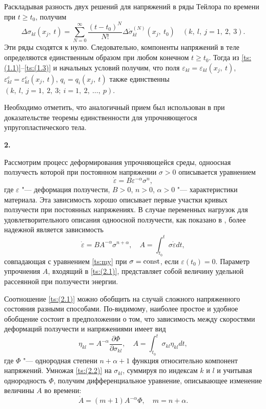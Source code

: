 Раскладывая разность двух решений для напряжений в ряды Тейлора по времени при $t\geq t_{0}$, получим
$$
\Delta\sigma_{kl}(x_{j},\:t)=\sum\limits_{N=0}^{\infty}\frac{(t-t_{0})^{N}}{N!}\Delta\dot{\sigma}_{kl}^{(N)}(x_{j},\:t_{0})\quad  (k,\:l,\:j=1,\:2,\:3).
$$
Эти ряды сходятся к нулю. 
Следовательно, компоненты напряжений в  теле определяются единственным образом при любом конечном $t\geq t_{0}$. 
Тогда из \eqref{ts:(1.1)}--\eqref{ts:(1.3)} и начальных условий получим, что поля 
$\varepsilon_{kl}=\varepsilon_{kl}(x_{j},\:t)$, $\varepsilon_{kl}^{c}=\varepsilon_{kl}^{c}(x_{j},\:t)$,
$ q_{i}=q_{i}(x_{j},\:t)$ также единственны $(k,\:l,\:j=1,\:2,\:3;\ i=1,\:2,\:\ldots,\:p)$.

Необходимо отметить, что аналогичный прием был использован в \cite{ts:Bykovtsev} при доказательстве теоремы единственности для упрочняющегося упругопластического тела.

\smallskip

\hypertarget{ts:2}{{\bf 2.}}
Рассмотрим процесс деформирования упрочняющейся среды, одноосная ползучесть которой при постоянном напряжении 
$\sigma>0$ описывается уравнением \cite{ts:Rabotnov} 
\begin{equation}
\dot{\varepsilon}=B\varepsilon^{-\alpha}\sigma^{n},
\label{ts:my}
\end{equation}
где $\varepsilon$  "--- деформация ползучести, $B>0$, $n>0$, $\alpha>0$ "--- характеристики материала. 
Эта зависимость хорошо описывает первые участки кривых ползучести при постоянных напряжениях. 
В случае переменных нагрузок для удовлетворительного описания одноосной ползучести, как показано в \cite{ts:Rabotnov, ts:SosninShokalo}, более надежной является зависимость
\begin{equation}
\dot{\varepsilon}=BA^{-\alpha}\sigma^{n+\alpha},\quad  A=\int_{t_{0}}^{t}\sigma\dot{\varepsilon}dt,
\label{ts:(2.1)}
\end{equation}
совпадающая с уравнением \eqref{ts:my} при $\sigma=\rm const$, если $\varepsilon(t_{0})=0$. 
Параметр упрочнения $A$, входящий в \eqref{ts:(2.1)}, представляет собой величину удельной рассеянной при ползучести энергии.

Соотношение \eqref{ts:(2.1)} можно обобщить на случай сложного напряженного состояния разными способами. 
По-видимому, наиболее простое и удобное  обобщение состоит в предположении о том, что зависимость между скоростями деформаций ползучести и напряжениями имеет вид \cite{ts:Rabotnov}
\begin{equation}
\eta_{kl}=A^{-\alpha}\frac{\partial\Phi}{\partial\sigma_{kl}},\quad  
A=\int_{t_{0}}^{t}\sigma_{kl}\eta_{kl}dt,
\label{ts:(2.2)}
\end{equation}
где $\Phi$ "--- однородная степени $n+\alpha+1$ функция относительно компонент напряжений. 
Умножая \eqref{ts:(2.2)}  на $\sigma_{kl}$, суммируя по индексам $k$ и $l$  и учитывая однородность $\Phi$, получим дифференциальное уравнение, описывающее изменение величины $A$ во времени:
\begin{equation}
\dot{A}=(m+1)A^{-\alpha}\Phi,\quad m=n+\alpha.
\label{ts:(2.3)}
\end{equation}

